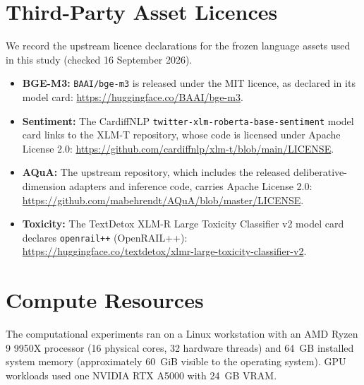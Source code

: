 \section{Third-Party Asset Licences}
\label{app:asset-licences}
We record the upstream licence declarations for the frozen language assets used in this study (checked 16 September 2026).
\begin{itemize}
\item \textbf{BGE-M3:} \texttt{BAAI/bge-m3} is released under the MIT licence, as declared in its model card: \url{https://huggingface.co/BAAI/bge-m3}.
\item \textbf{Sentiment:} The CardiffNLP \texttt{twitter-xlm-roberta-base-sentiment} model card links to the XLM-T repository, whose code is licensed under Apache License 2.0: \url{https://github.com/cardiffnlp/xlm-t/blob/main/LICENSE}.
\item \textbf{AQuA:} The upstream repository, which includes the released deliberative-dimension adapters and inference code, carries Apache License 2.0: \url{https://github.com/mabehrendt/AQuA/blob/master/LICENSE}.
\item \textbf{Toxicity:} The TextDetox XLM-R Large Toxicity Classifier v2 model card declares \texttt{openrail++} (OpenRAIL++): \url{https://huggingface.co/textdetox/xlmr-large-toxicity-classifier-v2}.
\end{itemize}

\section{Compute Resources}
\label{app:hardware}
The computational experiments ran on a Linux workstation with an AMD Ryzen 9
9950X processor (16 physical cores, 32 hardware threads) and 64~GB installed
system memory (approximately 60~GiB visible to the operating system). GPU
workloads used one NVIDIA RTX A5000 with 24~GB VRAM.

\onecolumn
\clearpage
\begin{landscape}
\begingroup
\small

\endgroup
\end{landscape}


